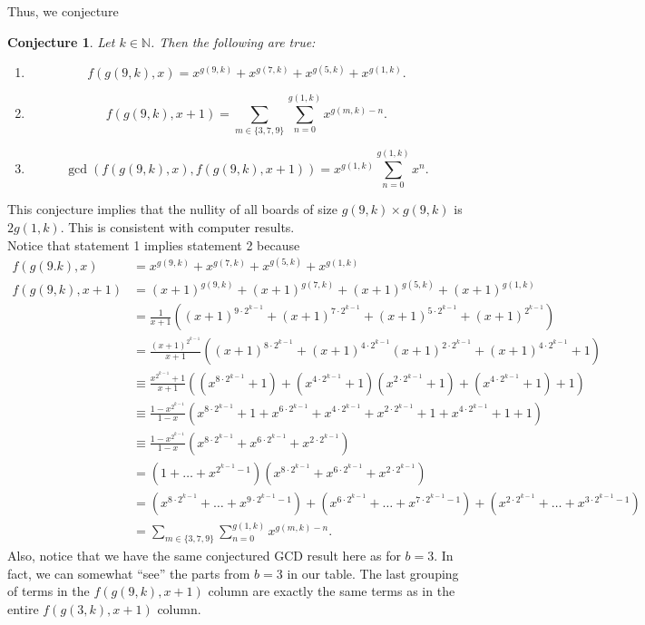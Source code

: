 \documentclass{article}
\newtheorem{conjecture}{Conjecture}
\newcommand{\N}{\mathbb{N}}
\begin{document}
	Thus, we conjecture
	\begin{conjecture}
		Let $k \in \N$.
		Then the following are true:
		\begin{enumerate}
			\item
			\begin{equation*}
				f(g(9,k),x) = x^{g(9,k)} + x^{g(7,k)} + x^{g(5,k)} + x^{g(1,k)}.
			\end{equation*}
			\item
			\begin{equation*}
				f(g(9,k),x+1) = \sum_{m\in\{3,7,9\}}{\sum_{n=0}^{g(1,k)}{x^{g(m,k)-n}}}.
			\end{equation*}
			\item
			\begin{equation*}
				\gcd\left(f(g(9,k),x),f(g(9,k),x+1)\right) = x^{g(1,k)}\sum_{n=0}^{g(1,k)}{x^n}.
			\end{equation*}
		\end{enumerate}
	\end{conjecture}
	This conjecture implies that the nullity of all boards of size $g(9,k) \times g(9,k)$ is $2g(1,k)$.
	This is consistent with computer results. \\
	
	Notice that statement 1 implies statement 2 because
	\begin{align*}
		f(g(9.k),x) &= x^{g(9,k)} + x^{g(7,k)} + x^{g(5,k)} + x^{g(1,k)} \\
		f(g(9,k),x+1) &= (x+1)^{g(9,k)} + (x+1)^{g(7,k)} + (x+1)^{g(5,k)} + (x+1)^{g(1,k)} \\
		&= \frac{1}{x+1}\left((x+1)^{9\cdot2^{k-1}} + (x+1)^{7\cdot2^{k-1}} + (x+1)^{5\cdot2^{k-1}} + (x+1)^{2^{k-1}}\right) \\
		&= \frac{(x+1)^{2^{k-1}}}{x+1}\left((x+1)^{8\cdot2^{k-1}} + (x+1)^{4\cdot2^{k-1}}(x+1)^{2\cdot2^{k-1}} + (x+1)^{4\cdot2^{k-1}} + 1\right) \\
		&\equiv \frac{x^{2^{k-1}}+1}{x+1}\left(\left(x^{8\cdot2^{k-1}}+1\right) + \left(x^{4\cdot2^{k-1}}+1\right)\left(x^{2\cdot2^{k-1}}+1\right) + \left(x^{4\cdot2^{k-1}}+1\right) + 1\right) \\
		&\equiv \frac{1-x^{2^{k-1}}}{1-x}\left(x^{8\cdot2^{k-1}} + 1 + x^{6\cdot2^{k-1}} + x^{4\cdot2^{k-1}} + x^{2\cdot2^{k-1}} + 1 + x^{4\cdot2^{k-1}} + 1 + 1\right) \\
		&\equiv \frac{1-x^{2^{k-1}}}{1-x}\left(x^{8\cdot2^{k-1}}+x^{6\cdot2^{k-1}}+x^{2\cdot2^{k-1}}\right) \\
		&= \left(1+\dots+x^{2^{k-1}-1}\right)\left(x^{8\cdot2^{k-1}}+x^{6\cdot2^{k-1}}+x^{2\cdot2^{k-1}}\right) \\
		&= \left(x^{8\cdot2^{k-1}}+\dots+x^{9\cdot2^{k-1}-1}\right) + \left(x^{6\cdot2^{k-1}}+\dots+x^{7\cdot2^{k-1}-1}\right) + \left(x^{2\cdot2^{k-1}}+\dots+x^{3\cdot2^{k-1}-1}\right) \\
		&= \sum_{m\in\{3,7,9\}}{\sum_{n=0}^{g(1,k)}{x^{g(m,k)-n}}}.
	\end{align*}
	Also, notice that we have the same conjectured GCD result here as for $b=3$.
	In fact, we can somewhat ``see'' the parts from $b=3$ in our table.
	The last grouping of terms in the $f(g(9,k),x+1)$ column are exactly the same terms as in the entire $f(g(3,k),x+1)$ column.
\end{document}
